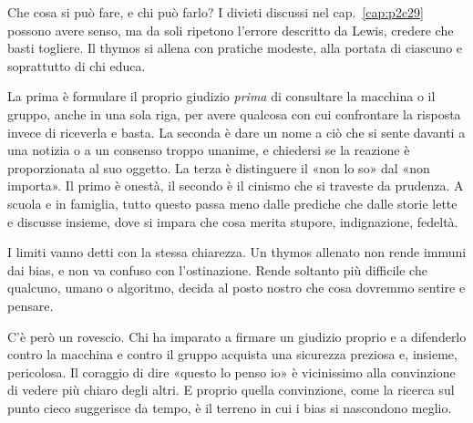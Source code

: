 Che cosa si può fare, e chi può farlo? I divieti discussi nel cap.~\ref{cap:p2c29} possono avere senso, ma da soli ripetono l'errore descritto da Lewis, credere che basti togliere. Il thymos si allena con pratiche modeste, alla portata di ciascuno e soprattutto di chi educa.

La prima è formulare il proprio giudizio \textit{prima} di consultare la macchina o il gruppo, anche in una sola riga, per avere qualcosa con cui confrontare la risposta invece di riceverla e basta. La seconda è dare un nome a ciò che si sente davanti a una notizia o a un consenso troppo unanime, e chiedersi se la reazione è proporzionata al suo oggetto. La terza è distinguere il «non lo so» dal «non importa». Il primo è onestà, il secondo è il cinismo che si traveste da prudenza. A scuola e in famiglia, tutto questo passa meno dalle prediche che dalle storie lette e discusse insieme, dove si impara che cosa merita stupore, indignazione, fedeltà.

I limiti vanno detti con la stessa chiarezza. Un thymos allenato non rende immuni dai bias, e non va confuso con l'ostinazione. Rende soltanto più difficile che qualcuno, umano o algoritmo, decida al posto nostro che cosa dovremmo sentire e pensare.

\bigskip

C'è però un rovescio. Chi ha imparato a firmare un giudizio proprio e a difenderlo contro la macchina e contro il gruppo acquista una sicurezza preziosa e, insieme, pericolosa. Il coraggio di dire «questo lo penso io» è vicinissimo alla convinzione di vedere più chiaro degli altri. E proprio quella convinzione, come la ricerca sul punto cieco suggerisce da tempo, è il terreno in cui i bias si nascondono meglio.
